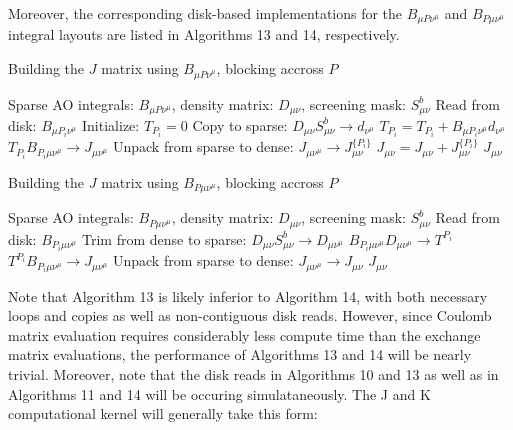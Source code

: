 \noindent Moreover, the corresponding disk-based implementations for the $B_{\mu P \nu^\mu}$ and $B_{P \mu \nu^\mu}$ integral
layouts are listed in Algorithms 13 and 14, respectively.

\begin{algorithm}[H]
\caption{Building the $J$ matrix using $B_{\mu P \nu^\mu}$, blocking accross $P$}
\begin{algorithmic}
\REQUIRE Sparse AO integrals: $B_{\mu P \nu^{\mu}}$, density matrix: $D_{\mu \nu}$, screening mask: $S_{\mu \nu}^b$
    \STATE Read from disk: $B_{\mu P_i \nu^{\mu}}$
    \STATE Initialize: $T_{P_i} = 0$
        \STATE Copy to sparse: $D_{\mu \nu}S_{\mu \nu}^b \rightarrow d_{\nu^{\mu} }$
        \STATE $T_{P_i} = T_{P_i} + B_{\mu P_i \nu^{\mu}}d_{\nu^{\mu}}$
    \ENDFOR    
    \STATE $T_{P_i} B_{P_i \mu \nu^{\mu}} \rightarrow J_{\mu \nu^{\mu}} $
    \STATE Unpack from sparse to dense: $J_{\mu \nu^{\mu}} \rightarrow J_{\mu \nu}^{\{P_i\}}$
    \STATE $J_{\mu \nu} = J_{\mu \nu} + J_{\mu \nu}^{\{P_i\}}$
\ENDFOR
\RETURN $J_{\mu \nu}$
\end{algorithmic}
\end{algorithm}

\begin{algorithm}[H]
\caption{Building the $J$ matrix using $B_{P \mu \nu^\mu}$, blocking accross $P$}
\begin{algorithmic}
\REQUIRE Sparse AO integrals: $B_{P \mu \nu^{\mu}}$, density matrix: $D_{\mu \nu}$, screening mask: $S_{\mu \nu}^b$
    \STATE Read from disk: $B_{P_i \mu \nu^{\mu}}$
    \STATE Trim from dense to sparse: $D_{\mu \nu}S_{\mu \nu}^b \rightarrow D_{\mu \nu^{\mu} }$
    \STATE $B_{P_i \mu\nu^{\mu}} D_{\mu \nu^{\mu}} \rightarrow T^{P_i}$
    \STATE $T^{P_i} B_{P_i \mu \nu^{\mu}} \rightarrow J_{\mu \nu^{\mu}} $
    \STATE Unpack from sparse to dense: $J_{\mu \nu^{\mu}} \rightarrow J_{\mu \nu}$
\ENDFOR
\RETURN $J_{\mu \nu}$
\end{algorithmic}
\end{algorithm}

\noindent Note that Algorithm 13 is likely inferior to Algorithm 14, with both necessary loops and copies as well as non-contiguous disk reads.
However, since Coulomb matrix evaluation requires considerably less compute time than the exchange matrix evaluations, 
the performance of Algorithms 13 and 14 will be nearly trivial. Moreover, note that the disk reads in Algorithms 10 and 13 as well as 
in Algorithms 11 and 14 will be occuring simulataneously. The J and K computational kernel will generally take this form:

